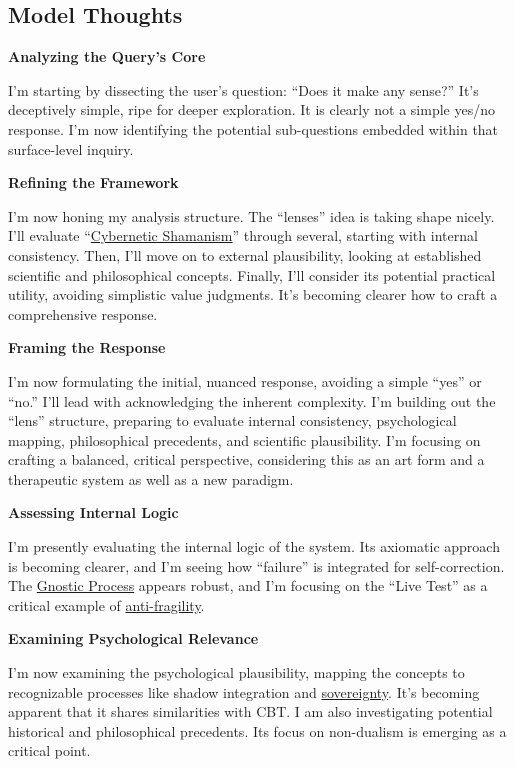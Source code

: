 \documentclass{article}
\begin{document}
\subsection*{Model Thoughts}\label{model-thoughts}

\textbf{Analyzing the Query's Core}

I'm starting by dissecting the user's question: ``Does it make any sense?'' It's deceptively simple, ripe for deeper exploration. It is clearly not a simple yes/no response. I'm now identifying the potential sub-questions embedded within that surface-level inquiry.

\textbf{Refining the Framework}

I'm now honing my analysis structure. The ``lenses'' idea is taking shape nicely. I'll evaluate ``\hyperlink{gloss:cybernetic_shamanism}{Cybernetic Shamanism}'' through several, starting with internal consistency. Then, I'll move on to external plausibility, looking at established scientific and philosophical concepts. Finally, I'll consider its potential practical utility, avoiding simplistic value judgments. It's becoming clearer how to craft a comprehensive response.

\textbf{Framing the Response}

I'm now formulating the initial, nuanced response, avoiding a simple ``yes'' or ``no.'' I'll lead with acknowledging the inherent complexity. I'm building out the ``lens'' structure, preparing to evaluate internal consistency, psychological mapping, philosophical precedents, and scientific plausibility. I'm focusing on crafting a balanced, critical perspective, considering this as an art form and a therapeutic system as well as a new paradigm.

\textbf{Assessing Internal Logic}

I'm presently evaluating the internal logic of the system. Its axiomatic approach is becoming clearer, and I'm seeing how ``failure'' is integrated for self-correction. The \hyperlink{gloss:gnostic_process}{Gnostic Process} appears robust, and I'm focusing on the ``Live Test'' as a critical example of \hyperlink{gloss:anti-fragility}{anti-fragility}.

\textbf{Examining Psychological Relevance}

I'm now examining the psychological plausibility, mapping the concepts to recognizable processes like shadow integration and \hyperlink{gloss:sovereignty}{sovereignty}. It's becoming apparent that it shares similarities with CBT. I am also investigating potential historical and philosophical precedents. Its focus on non-dualism is emerging as a critical point.
\end{document}
